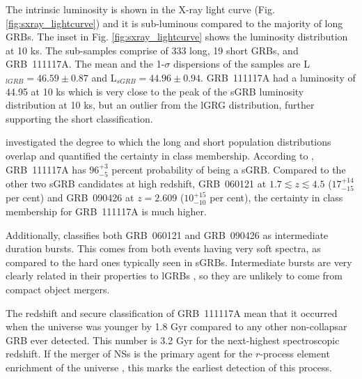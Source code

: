 \documentclass{aa}    %
\begin{document}
The intrinsic luminosity is shown in the X-ray light curve (Fig.
\ref{fig:sxray_lightcurve}) and it is sub-luminous compared to the majority of
long GRBs. The inset in Fig. \ref{fig:sxray_lightcurve} shows the luminosity
distribution at 10 ks. The sub-samples comprise of 333 long, 19 short GRBs, and
GRB~111117A. The mean and the 1-$\sigma$ dispersions of the samples are
L$_{lGRB} = 46.59 \pm 0.87$ and L$_{sGRB} = 44.96 \pm 0.94$. GRB~111117A had a
luminosity of 44.95 at 10 ks which is very close to the peak of the sGRB
luminosity distribution at 10 ks, but an outlier from the lGRG distribution,
further supporting the short classification.

\citet{Bromberg2013} investigated the degree to which the long and short
population distributions overlap and quantified the certainty in class
membership. According to \citet{Bromberg2013}, GRB~111117A has $96_{-5}^{+3}$
percent probability of being a sGRB. Compared to the other two sGRB candidates
at high redshift, GRB~060121 \citep{DeUgartePostigo2006, Levan2006} at $1.7
\lesssim z \lesssim 4.5$ ($17_{-15}^{+14}$ per cent) and GRB~090426
\citep{Antonelli2009, Levesque2010, Thone2011} at $z = 2.609$ ($10_{-10}^{+15}$
per cent), the certainty in class membership for GRB~111117A is much higher.

Additionally, \citet{Horvath2010} classifies both GRB~060121 and GRB~090426 as
intermediate duration bursts. This comes from both events having very soft
spectra, as compared to the hard ones typically seen in sGRBs. Intermediate
bursts are very clearly related in their properties to lGRBs
\citep{DeUgartePostigo2011}, so they are unlikely to come from compact object
mergers.

The redshift and secure classification of GRB~111117A mean that it occurred
when the universe was younger by 1.8 Gyr compared to any other non-collapsar GRB
ever detected. This number is 3.2 Gyr for the next-highest spectroscopic
redshift. If the merger of NSs is the primary agent for the $r$-process element
enrichment of the universe \citep{Goriely2011, Ji2016, Komiya2016}, this
marks the earliest detection of this process.
\end{document}
